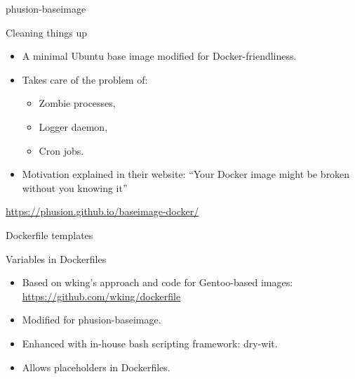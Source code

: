 \documentclass[presentation,c]{beamer}
\begin{document}
{
\begin{frame}[label=sec-9-5]{phusion-baseimage}

\begin{block}{Cleaning things up}

\begin{itemize}
\item A minimal Ubuntu base image modified for Docker-friendliness.
\item Takes care of the problem of:
\begin{itemize}
\item Zombie processes,
\item Logger daemon,
\item Cron jobs.
\end{itemize}
\item Motivation explained in their website: ``Your Docker image might be broken without you knowing it''
\end{itemize}
\url{https://phusion.github.io/baseimage-docker/}
\end{block}
\end{frame}
} %

{
\begin{frame}[label=sec-9-6]{Dockerfile templates}

\begin{block}{Variables in Dockerfiles}

\begin{itemize}
\item Based on wking's approach and code for Gentoo-based images:
\url{https://github.com/wking/dockerfile}
\item Modified for phusion-baseimage.
\item Enhanced with in-house bash scripting framework: dry-wit.
\item Allows placeholders in Dockerfiles.
\end{itemize}
\end{block}
\end{frame}
} %
\end{document}

